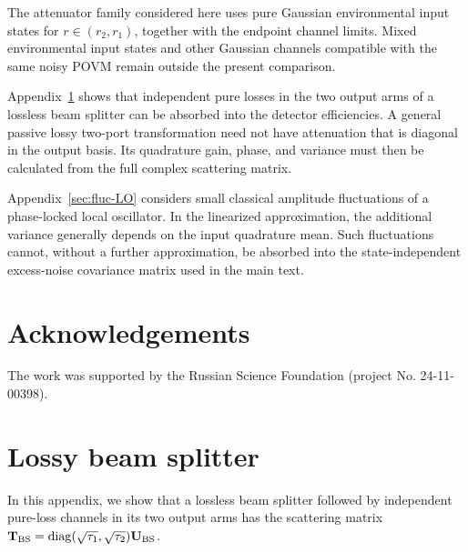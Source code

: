 \documentclass[%
final, 
superscriptaddress,
 amsmath,amssymb,amsfonts,
 aps,
 pra,
 longbibliography,
]{revtex4-2}
\newcommand{\diag}{\mathop{\rm diag}\nolimits}
\newcommand{\vc}[1]{\mathbf{#1}}
\newcommand{\ind}[1]{\mathrm{#1}}
\begin{document}
The attenuator family considered here uses pure Gaussian environmental input states for $r\in(r_2,r_1)$, together with the endpoint channel limits. Mixed environmental input states and other Gaussian channels compatible with the same noisy POVM remain outside the present comparison.

Appendix~\ref{sec:lossy-bs} shows that independent pure losses in the two output arms of a lossless beam splitter can be absorbed into the detector efficiencies. A general passive lossy two-port transformation need not have attenuation that is diagonal in the output basis. Its quadrature gain, phase, and variance must then be calculated from the full complex scattering matrix.

Appendix~\ref{sec:fluc-LO} considers small classical amplitude fluctuations of a phase-locked local oscillator. In the linearized approximation, the additional variance generally depends on the input quadrature mean. Such fluctuations cannot, without a further approximation, be absorbed into the state-independent excess-noise covariance matrix used in the main text.

\section*{Acknowledgements}
The work was supported by the Russian Science Foundation (project No. 24-11-00398).

\appendix
\section{Lossy beam splitter}
\label{sec:lossy-bs}
In this appendix, %
we show that a lossless beam splitter followed by independent pure-loss channels in its two output arms has the scattering matrix
$\vc{T}_{\ind{BS}}=
\diag(\sqrt{\tau_1},\sqrt{\tau_2})\vc{U}_{\ind{BS}}$.
\end{document}
